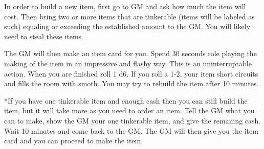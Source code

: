 \documentclass[blue]{LRSguildcamp1}
\begin{document}
\name{\bTest{}}

In order to build a new item, first go to GM and ask how much the item will cost. Then bring two or more items that are tinkerable (items will be labeled as such) equaling or exceeding the established amount to the GM. You will likely need to steal these items.  

The GM will then make an item card for you. Spend 30 seconds role playing the making of the item in an impressive and flashy way. This is an uninterruptable action. When you are finished roll 1 d6.  If you roll a 1-2, your item short circuits and fills the room with smoth. You may try to rebuild the item after 10 minutes. 

*If you have one tinkerable item and enough cash then you can still build the item, but it will take more as you need to order an item. Tell the GM what you can to make, show the GM your one tinkerable item, and give the remaning cash. Wait 10 minutes and come back to the GM. The GM will then give you the item card and you can proceed to make the item. 

\end{document}
